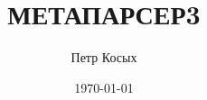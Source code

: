 
\usepackage{indentfirst}
\setmainlanguage{russian}
\title{МЕТАПАРСЕР3}
\author{Петр Косых}
\date{\today}
\sloppy

\maketitle
{
\hypersetup{linkcolor=black}
\renewcommand{\contentsname}{Оглавление}

\tableofcontents
\clearpage
}



